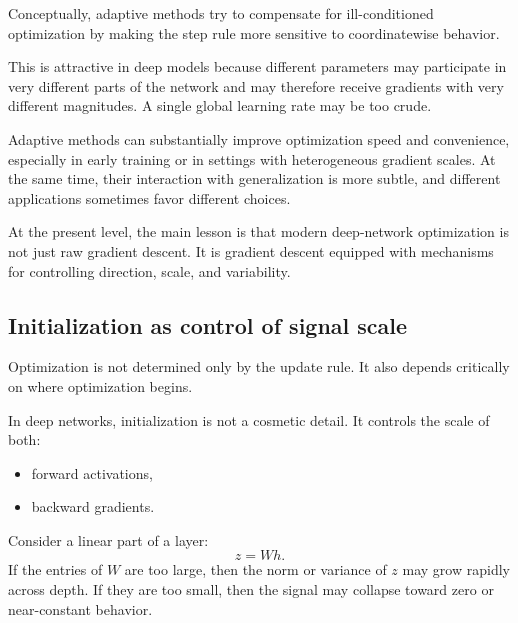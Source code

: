 \medskip

Conceptually, adaptive methods try to compensate for ill-conditioned optimization by making the step rule more sensitive to coordinatewise behavior.

\medskip

This is attractive in deep models because different parameters may participate in very different parts of the network and may therefore receive gradients with very different magnitudes.
A single global learning rate may be too crude.

\medskip

Adaptive methods can substantially improve optimization speed and convenience, especially in early training or in settings with heterogeneous gradient scales.
At the same time, their interaction with generalization is more subtle, and different applications sometimes favor different choices.


\medskip

At the present level, the main lesson is that modern deep-network optimization is not just raw gradient descent.
It is gradient descent equipped with mechanisms for controlling direction, scale, and variability.

\subsection*{Initialization as control of signal scale}

Optimization is not determined only by the update rule.
It also depends critically on where optimization begins.

\medskip

In deep networks, initialization is not a cosmetic detail.
It controls the scale of both:
\begin{itemize}
    \item forward activations,
    \item backward gradients.
\end{itemize}

\medskip

Consider a linear part of a layer:
\[
z = Wh.
\]
If the entries of $W$ are too large, then the norm or variance of $z$ may grow rapidly across depth.
If they are too small, then the signal may collapse toward zero or near-constant behavior.


